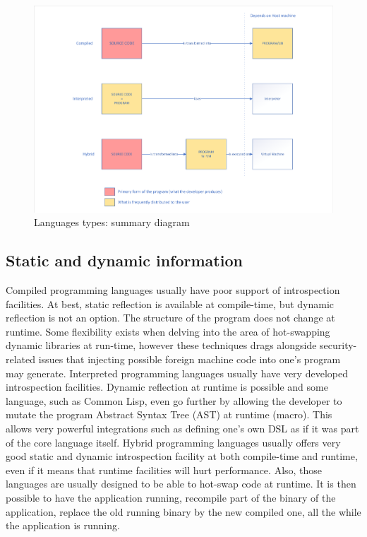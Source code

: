 \begin{figure}[htbp]
  \centering
  \includegraphics[width=.9\linewidth]{../figures/comp_inter_hybrid_summary}
  \caption{Languages types: summary diagram}
  \label{fig:static.dynamic.summary.pipeline}
\end{figure}

\subsection{Static and dynamic information}

Compiled programming languages usually have poor support of introspection facilities. At best, static reflection is
available at compile-time, but dynamic reflection is not an option. The structure of the program does not change at
runtime. Some flexibility exists when delving into the area of hot-swapping dynamic libraries at run-time, however these
techniques drags alongside security-related issues that injecting possible foreign machine code into one's program may
generate.
Interpreted programming languages usually have very developed introspection facilities. Dynamic reflection at
runtime is possible and some language, such as Common Lisp, even go further by allowing the developer to mutate the
program Abstract Syntax Tree (AST) at runtime (macro). This allows very powerful integrations such as defining one's own
DSL as if it was part of the core language itself.
Hybrid programming languages usually offers very good static and dynamic introspection facility at both compile-time and
runtime, even if it means that runtime facilities will hurt performance. Also, those languages are usually designed to
be able to hot-swap code at runtime. It is then possible to have the application running, recompile part of the binary
of the application, replace the old running binary by the new compiled one, all the while the application is running.

